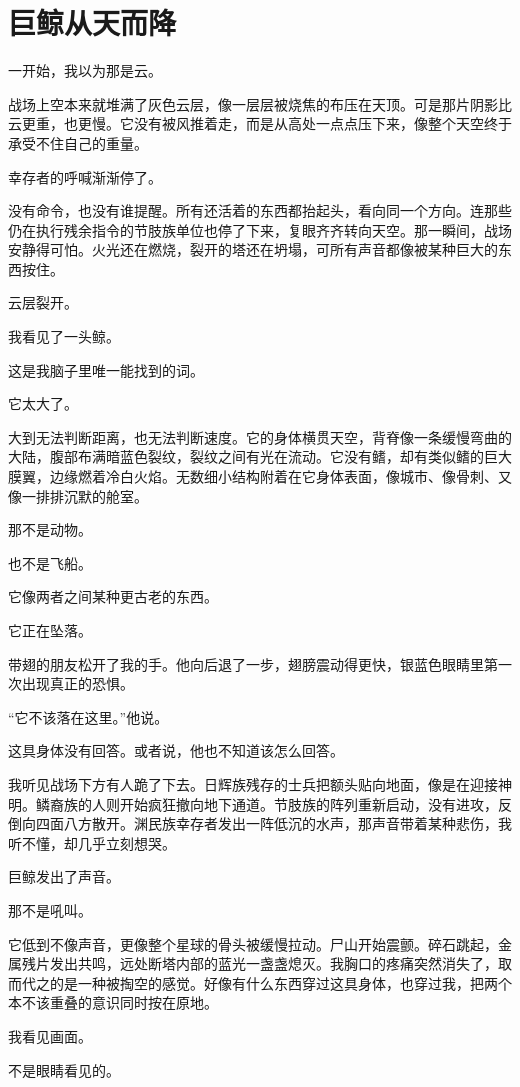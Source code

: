 \chapter{巨鲸从天而降}

一开始，我以为那是云。

战场上空本来就堆满了灰色云层，像一层层被烧焦的布压在天顶。可是那片阴影比云更重，也更慢。它没有被风推着走，而是从高处一点点压下来，像整个天空终于承受不住自己的重量。

幸存者的呼喊渐渐停了。

没有命令，也没有谁提醒。所有还活着的东西都抬起头，看向同一个方向。连那些仍在执行残余指令的节肢族单位也停了下来，复眼齐齐转向天空。那一瞬间，战场安静得可怕。火光还在燃烧，裂开的塔还在坍塌，可所有声音都像被某种巨大的东西按住。

云层裂开。

我看见了一头鲸。

这是我脑子里唯一能找到的词。

它太大了。

大到无法判断距离，也无法判断速度。它的身体横贯天空，背脊像一条缓慢弯曲的大陆，腹部布满暗蓝色裂纹，裂纹之间有光在流动。它没有鳍，却有类似鳍的巨大膜翼，边缘燃着冷白火焰。无数细小结构附着在它身体表面，像城市、像骨刺、又像一排排沉默的舱室。

那不是动物。

也不是飞船。

它像两者之间某种更古老的东西。

它正在坠落。

带翅的朋友松开了我的手。他向后退了一步，翅膀震动得更快，银蓝色眼睛里第一次出现真正的恐惧。

“它不该落在这里。”他说。

这具身体没有回答。或者说，他也不知道该怎么回答。

我听见战场下方有人跪了下去。日辉族残存的士兵把额头贴向地面，像是在迎接神明。鳞裔族的人则开始疯狂撤向地下通道。节肢族的阵列重新启动，没有进攻，反倒向四面八方散开。渊民族幸存者发出一阵低沉的水声，那声音带着某种悲伤，我听不懂，却几乎立刻想哭。

巨鲸发出了声音。

那不是吼叫。

它低到不像声音，更像整个星球的骨头被缓慢拉动。尸山开始震颤。碎石跳起，金属残片发出共鸣，远处断塔内部的蓝光一盏盏熄灭。我胸口的疼痛突然消失了，取而代之的是一种被掏空的感觉。好像有什么东西穿过这具身体，也穿过我，把两个本不该重叠的意识同时按在原地。

我看见画面。

不是眼睛看见的。

